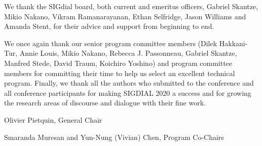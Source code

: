We thank the SIGdial board, both current and emeritus officers, Gabriel Skantze, Mikio Nakano, Vikram Ramanarayanan, Ethan Selfridge, Jason Williams and Amanda Stent, for their advice and support from beginning to end.

We once again thank our senior program committee members (Dilek Hakkani-Tur,    Annie Louis, Mikio Nakano, Rebecca J. Passonneau, Gabriel Skantze,  Manfred Stede, David Traum, Koichiro Yoshino) and program committee members for committing their time to help us select an excellent technical program. Finally, we thank all the authors who submitted to the conference and all conference participants for making SIGDIAL 2020 a success and for growing the research areas of discourse and dialogue with their fine work.

\vspace*{2cm}

Olivier Pietquin, General Chair

Smaranda Muresan and Yun-Nung (Vivian) Chen, Program Co-Chairs

